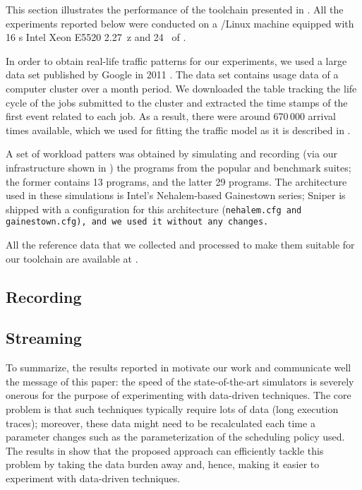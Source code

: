 This section illustrates the performance of the toolchain presented in
. All the experiments reported below were conducted on a
/Linux machine equipped with 16 s Intel Xeon E5520 2.27~z
and 24~ of .

In order to obtain real-life traffic patterns for our experiments, we used a
large data set published by Google in 2011 \cite{reiss2011}. The data set
contains usage data of a computer cluster over a month period. We downloaded the
table tracking the life cycle of the jobs submitted to the cluster and extracted
the time stamps of the first event related to each job. As a result, there were
around 670\,000 arrival times available, which we used for fitting the traffic
model as it is described in .

A set of workload patters was obtained by simulating and recording (via our
infrastructure shown in ) the programs from the popular
 \cite{bienia2011} and  \cite{cpu2006} benchmark
suites; the former contains 13 programs, and the latter 29 programs. The
architecture used in these simulations is Intel's Nehalem-based Gainestown
series; Sniper is shipped with a configuration for this architecture
(\tt{nehalem.cfg} and \tt{gainestown.cfg}), and we used it without any changes.

All the reference data that we collected and processed to make them suitable for
our toolchain are available at \cite{sources}.

\subsection{Recording}


\subsection{Streaming}


To summarize, the results reported in  motivate our work and
communicate well the message of this paper: the speed of the state-of-the-art
simulators is severely onerous for the purpose of experimenting with data-driven
techniques. The core problem is that such techniques typically require lots of
data (long execution traces); moreover, these data might need to be recalculated
each time a parameter changes such as the parameterization of the scheduling
policy used. The results in  show that the proposed approach can
efficiently tackle this problem by taking the data burden away and, hence,
making it easier to experiment with data-driven techniques.
